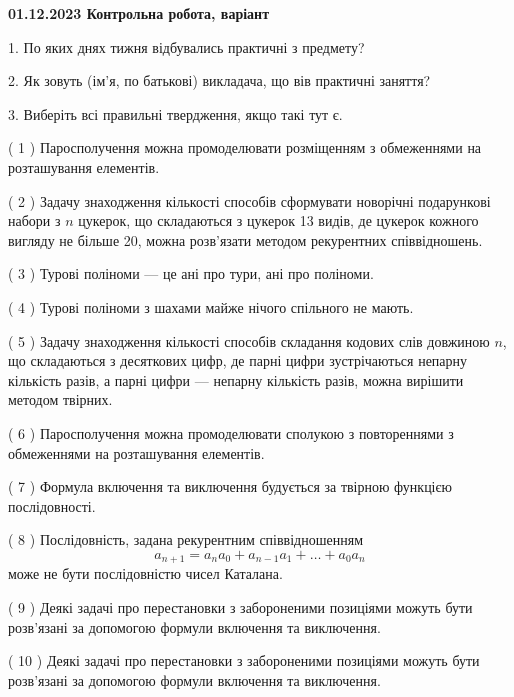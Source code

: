 \documentclass[12pt, ukrainian]{article}
\begin{document}
\vspace{4mm}
\newpage
\begin {large}

\textbf{01.12.2023 Контрольна робота, варіант  }\par


{
1. По яких днях тижня відбувались практичні з предмету?



\vspace{5mm}
2. Як зовуть (ім'я, по батькові) викладача, що вів практичні заняття?



\vspace{5mm}
3. Виберіть всі правильні твердження, якщо такі тут є.\par
\vspace{2mm}
( 1 ) Паросполучення можна промоделювати розміщенням з обмеженнями на розташування елементів.%

( 2 ) Задачу знаходження кількості способів сформувати новорічні подарункові набори з $n$ цукерок, що складаються з цукерок 13 видів, де цукерок кожного вигляду не більше 20, можна розв’язати методом рекурентних співвідношень.%

( 3 ) Турові поліноми --- це ані про тури, ані про поліноми.%

( 4 ) Турові поліноми з шахами майже нічого спільного не мають.%

( 5 ) Задачу знаходження кількості способів складання кодових слів довжиною $n$, що складаються з десяткових цифр, де парні цифри зустрічаються непарну кількість разів, а парні цифри — непарну кількість разів, можна вирішити методом твірних.%

( 6 ) Паросполучення можна промоделювати сполукою з повтореннями з обмеженнями на розташування елементів.%

( 7 ) Формула включення та виключення будується за твірною функцією послідовності.%

( 8 ) Послідовність, задана рекурентним співвідношенням $$a_{n+1}=a_{n}a_{0}+a_{n-1}a_{1}+\ldots+a_0a_{n}$$ може не бути послідовністю чисел Каталана.%

( 9 ) Деякі задачі про перестановки з забороненими позиціями можуть бути розв’я\-за\-ні за допомогою формули включення та виключення.%

( 10 ) Деякі задачі про перестановки з забороненими позиціями можуть бути розв’я\-за\-ні за допомогою формули включення та виключення.%
}
\end {large}
\end{document}
